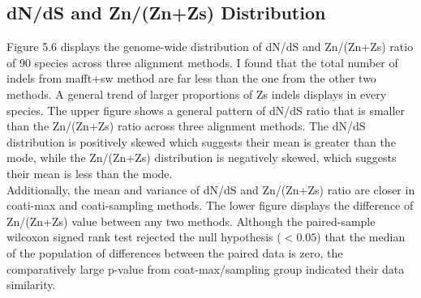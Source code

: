 \subsection{dN/dS and Zn/(Zn+Zs) Distribution}
Figure 5.6 displays the genome-wide distribution of dN/dS and Zn/(Zn+Zs) ratio of 90 species across three alignment methods. I found that the total number of indels from mafft+sw method are far less than the one from the other two methods. A general trend of larger proportions of Zs indels displays in every species. The upper figure shows a general pattern of dN/dS ratio that is smaller than the Zn/(Zn+Zs) ratio across three alignment methods. The dN/dS distribution is positively skewed which suggests their mean is greater than the mode, while the Zn/(Zn+Zs) distribution is negatively skewed, which suggests their mean is less than the mode.\\
\indent Additionally, the mean and variance of dN/dS and Zn/(Zn+Zs) ratio are closer in coati-max and coati-sampling methods. The lower figure displays the difference of Zn/(Zn+Zs) value between any two methods. Although the paired-sample wilcoxon signed rank test rejected the null hypothesis ($<0.05$) that the median of the population of differences between the paired data is zero, the comparatively large p-value from coat-max/sampling group indicated their data similarity. 
\newpage
